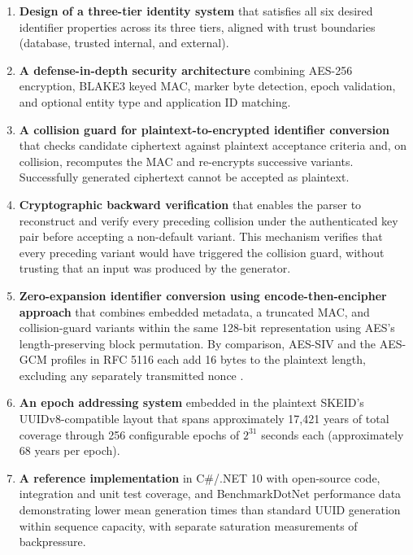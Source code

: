 \documentclass[a4paper,fleqn]{cas-sc}
\providecommand{\tightlist}{%
  \setlength{\itemsep}{0pt}\setlength{\parskip}{0pt}}
\begin{document}
\begin{enumerate}
\def\labelenumi{\arabic{enumi}.}
\tightlist
\item
  \textbf{Design of a three-tier identity system} that satisfies all six
  desired identifier properties across its three tiers, aligned with
  trust boundaries (database, trusted internal, and external).
\item
  \textbf{A defense-in-depth security architecture} combining AES-256
  encryption, BLAKE3 keyed MAC, marker byte detection, epoch validation,
  and optional entity type and application ID matching.
\item
  \textbf{A collision guard for plaintext-to-encrypted identifier
  conversion} that checks candidate ciphertext against plaintext
  acceptance criteria and, on collision, recomputes the MAC and
  re-encrypts successive variants. Successfully generated ciphertext
  cannot be accepted as plaintext.
\item
  \textbf{Cryptographic backward verification} that enables the parser
  to reconstruct and verify every preceding collision under the
  authenticated key pair before accepting a non-default variant. This
  mechanism verifies that every preceding variant would have triggered
  the collision guard, without trusting that an input was produced by
  the generator.
\item
  \textbf{Zero-expansion identifier conversion using
  encode-then-encipher approach} that combines embedded metadata, a
  truncated MAC, and collision-guard variants within the same 128-bit
  representation using AES's length-preserving block permutation. By
  comparison, AES-SIV and the AES-GCM profiles in RFC 5116 each add 16
  bytes to the plaintext length, excluding any separately transmitted
  nonce \citetext{\citealp[Section 2.6]{rfc5297}; \citealp[Sections 5.1
  and 5.2]{rfc5116}}.
\item
  \textbf{An epoch addressing system} embedded in the plaintext SKEID's
  UUIDv8-compatible layout that spans approximately 17,421 years of
  total coverage through 256 configurable epochs of \(2^{31}\) seconds
  each (approximately 68 years per epoch).
\item
  \textbf{A reference implementation} in C\#/.NET 10 with open-source
  code, integration and unit test coverage, and BenchmarkDotNet
  performance data demonstrating lower mean generation times than
  standard UUID generation within sequence capacity, with separate
  saturation measurements of backpressure.
\end{enumerate}
\end{document}
